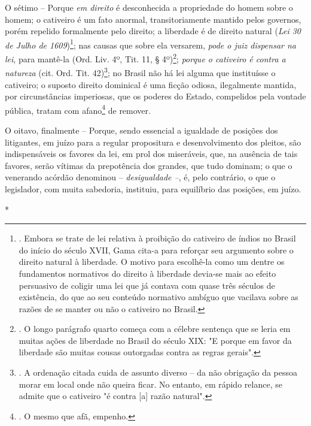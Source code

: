 O sétimo -- Porque \emph{em direito} é desconhecida a propriedade do
homem sobre o homem; o cativeiro é um fato anormal, transitoriamente
mantido pelos governos, porém repelido formalmente pelo direito; a
liberdade é de direito natural (\emph{Lei 30 de Julho de
1609})\footnote{. Embora se trate de lei relativa à proibição do
  cativeiro de índios no Brasil do início do século XVII, Gama cita-a
  para reforçar seu argumento sobre o direito natural à liberdade. O
  motivo para escolhê-la como um dentre os fundamentos normativos do
  direito à liberdade devia-se mais ao efeito persuasivo de coligir uma
  lei que já contava com quase três séculos de existência, do que ao seu
  conteúdo normativo ambíguo que vacilava sobre as razões de se manter
  ou não o cativeiro no Brasil.}; nas causas que sobre ela versarem,
\emph{pode o juiz dispensar na lei}, para mantê-la (Ord. Liv. 4º, Tit.
11, § 4º)\footnote{. O longo parágrafo quarto começa com a célebre
  sentença que se leria em muitas ações de liberdade no Brasil do século
  XIX: "E porque em favor da liberdade são muitas cousas outorgadas
  contra as regras gerais".}; \emph{porque o cativeiro é contra a
natureza} (cit. Ord. Tit. 42)\footnote{. A ordenação citada cuida de
  assunto diverso -- da não obrigação da pessoa morar em local onde não
  queira ficar. No entanto, em rápido relance, se admite que o cativeiro
  "é contra {[}a{]} razão natural".}; no Brasil não há lei alguma que
instituísse o cativeiro; o suposto direito dominical é uma ficção
odiosa, ilegalmente mantida, por circunstâncias imperiosas, que os
poderes do Estado, compelidos pela vontade pública, tratam com
afano\footnote{. O mesmo que afã, empenho.} de remover.

O oitavo, finalmente -- Porque, sendo essencial a igualdade de posições
dos litigantes, em juízo para a regular propositura e desenvolvimento
dos pleitos, são indispensáveis os favores da lei, em prol dos
miseráveis, que, na ausência de tais favores, serão vítimas da
prepotência dos grandes, que tudo dominam; o que o venerando acórdão
denominou -- \emph{desigualdade --}, é, pelo contrário, o que o
legislador, com muita sabedoria, instituiu, para equilíbrio das
posições, em juízo.

*

